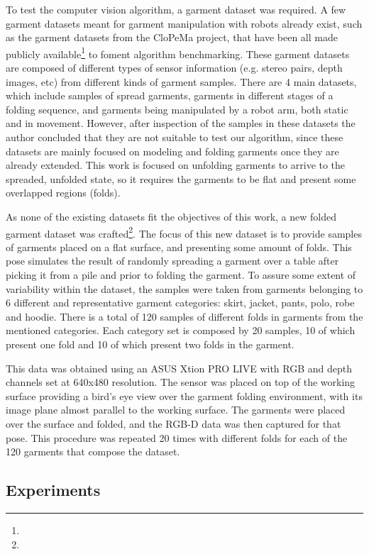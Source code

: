 To test the computer vision algorithm, a garment dataset was required. A few garment datasets meant for garment manipulation with robots already exist, such as the garment datasets from the CloPeMa project, that have been all made publicly available\footnote{} to foment algorithm benchmarking. These garment datasets are composed of different types of sensor information (e.g. stereo pairs, depth images, etc) from different kinds of garment samples. There are 4 main datasets, which include samples of spread garments, garments in different stages of a folding sequence, and garments being manipulated by a robot arm, both static and in movement. However, after inspection of the samples in these datasets the author concluded that they are not suitable to test our algorithm, since these datasets are mainly focused on modeling and folding garments once they are already extended. This work is focused on unfolding garments to arrive to the spreaded, unfolded state, so it requires the garments to be flat and present some overlapped regions (folds).

As none of the existing datasets fit the objectives of this work, a new folded garment dataset was crafted\footnote{}. The focus of this new dataset is to provide samples of garments placed on a flat surface, and presenting some amount of folds. This pose simulates the result of randomly spreading a garment over a table after picking it from a pile and prior to folding the garment.
To assure some extent of variability within the dataset, the samples were taken from garments belonging to 6 different and representative garment categories: skirt, jacket, pants, polo, robe and hoodie. There is a total of 120 samples of different folds in garments from the mentioned categories.  Each category set is composed by 20 samples, 10 of which present one fold and 10 of which present two folds in the garment. 

This data was obtained using an ASUS Xtion PRO LIVE with RGB and depth channels set at 640x480 resolution. The sensor was placed on top of the working surface providing a bird's eye view over the garment folding environment, with its image plane almost parallel to the working surface. The garments were placed over the surface and folded, and the RGB-D data was then captured for that pose. This procedure was repeated 20 times with different folds for each of the 120 garments that compose the dataset.

\subsection{Experiments}
\label{experiments:experiments}

